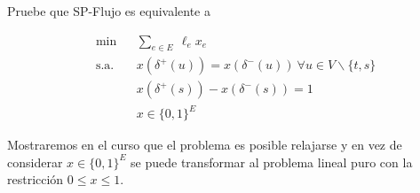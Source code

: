 \begin{eje}
\begin{enumerate}[\bf I.-]
\begin{ejer}Pruebe que SP-Flujo es equivalente a

\begin{equation*}
\begin{aligned}
& \min
& & \displaystyle{\sum_{e \in E}}~\ell_{e}x_{e}\\
& \text{s.a.}
& & x(\delta^{+}(u))=x(\delta^{-}(u))~ \forall u \in V \backslash\{t,s\} \\
&&& x(\delta^{+}(s))-x(\delta^{-}(s))=1\\
&&& x \in\{0,1\}^{E}
\end{aligned}
\end{equation*}


\end{ejer}
    
\end{enumerate}

Mostraremos en el curso que el problema es posible relajarse y en vez de considerar $x\in \{0,1\}^{E}$ se puede transformar al problema lineal puro con la restricción  $0 \leq x \leq 1$.




\end{eje}


% 

